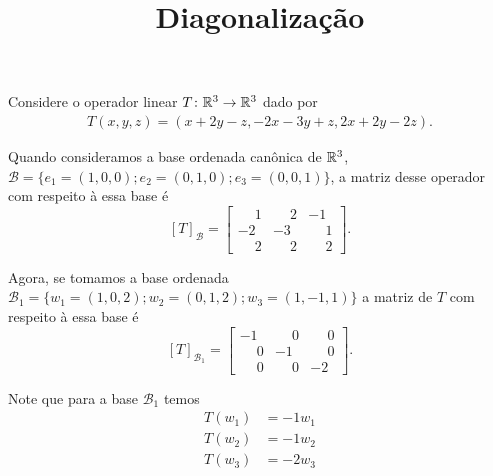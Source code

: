 \documentclass{beamer}
\title{Diagonalização}
\author[\autor]{\autor}
\institute[\instituto]{\instituto}
\date{}
\begin{document}
    \begin{frame}
        \maketitle
    \end{frame}


    \begin{frame}
        Considere o operador linear $T \colon \mathbb{R}^3 \to \mathbb{R}^3$ dado por
        \begin{align*}
            T(x, y, z) = (x + 2y - z, -2x -3y + z, 2x + 2y - 2z).
        \end{align*}

        Quando consideramos a base ordenada canônica de $\mathbb{R}^3$, $\mathcal{B} = \{e_1 = (1, 0, 0); e_2 = (0, 1, 0); e_3 = (0, 0, 1)\}$, a matriz desse operador com respeito à essa base é
        \[
        [T]_\mathcal{B} = \begin{bmatrix}
            \phantom{-}1 & \phantom{-}2 & -1\\
            -2 & -3 & \phantom{-}1\\
            \phantom{-}2 & \phantom{-}2 & \phantom{-}2
        \end{bmatrix}.
        \]
    \end{frame}

    \begin{frame}
        Agora, se tomamos a base ordenada $\mathcal{B}_1 = \{w_1 = (1, 0, 2); w_2 = (0, 1, 2); w_3 = (1, -1, 1)\}$ a matriz de $T$ com respeito à essa base é
        \[
        [T]_{\mathcal{B}_1} = \begin{bmatrix}
            -1 & \phantom{-}0 & \phantom{-}0\\
            \phantom{-}0& -1 & \phantom{-}0\\
            \phantom{-}0& \phantom{-}0 & -2
        \end{bmatrix}.
        \]

        Note que para a base $\mathcal{B}_1$ temos
        \begin{align*}
            T(w_1) &= -1w_1\\
            T(w_2) &= -1w_2\\
            T(w_3) &= -2w_3\\
        \end{align*}
    \end{frame}
\end{document}
